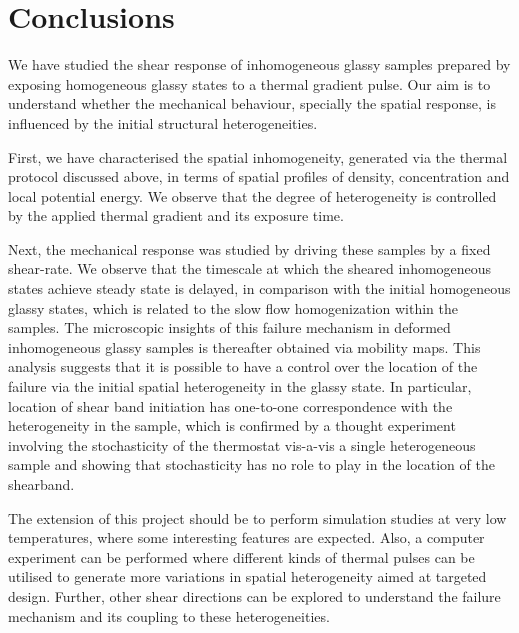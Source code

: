 \section{Conclusions}

We have studied the shear response of inhomogeneous glassy samples prepared by exposing homogeneous glassy states to a thermal gradient pulse. Our aim is to understand whether the mechanical behaviour, specially the spatial response, is influenced by the initial structural heterogeneities. 


First, we have characterised the spatial inhomogeneity, generated via the thermal protocol discussed above, in terms of spatial profiles of density, concentration and local potential energy. We observe that the degree of heterogeneity is controlled by the applied thermal gradient and its exposure time. 


Next, the mechanical response was studied by driving these samples by a fixed shear-rate. We observe that the timescale at which the sheared inhomogeneous states achieve steady state is delayed, in comparison with the initial homogeneous glassy states, which is related to the slow flow homogenization within the samples. The microscopic insights of this failure mechanism in deformed inhomogeneous glassy samples is thereafter obtained via mobility maps. This analysis suggests that it is possible to have a control over the location of the failure via the initial spatial heterogeneity in the glassy state. In particular, location of shear band initiation has one-to-one correspondence with the heterogeneity in the sample, which is confirmed by a thought experiment involving the stochasticity of the thermostat vis-a-vis a single heterogeneous sample and showing that stochasticity has no role to play in the location of the shearband. 

The extension of this project should be to perform simulation studies at very low temperatures, where some interesting features are expected. Also, a computer experiment can be performed where different kinds of thermal pulses can be utilised to generate more variations in spatial heterogeneity aimed at targeted design. Further, other shear directions can be explored to understand the failure mechanism and its coupling to these heterogeneities.